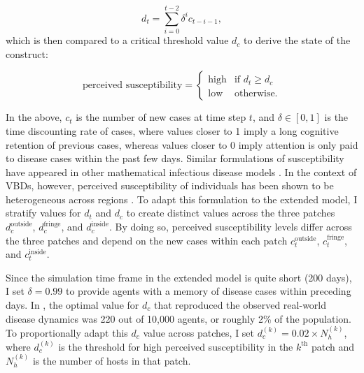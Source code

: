 \begin{equation}\label{eq:susceptibility}
    d_t=\sum_{i=0}^{t-2}\delta^i c_{t-i-1},
\end{equation}
which is then compared to a critical threshold value $d_c$ to derive the state of the construct:

\begin{equation*}
    \text{perceived susceptibility}=\begin{cases}
        \text{high} & \text{if } d_t\ge d_c \\
        \text{low} & \text{otherwise.}
    \end{cases}
\end{equation*}

In the above, $c_t$ is the number of new cases at time step $t$, and $\delta\in[0,1]$ is the time discounting rate of cases, where values closer to 1 imply a long cognitive retention of previous cases, whereas values closer to 0 imply attention is only paid to disease cases within the past few days. Similar formulations of susceptibility have appeared in other mathematical infectious disease models \cite{chen_public_2011, poletti_effect_2011}. In the context of VBDs, however, perceived susceptibility of individuals has been shown to be heterogeneous across regions \cite{raude_public_2012}. To adapt this formulation to the extended model, I stratify values for $d_t$ and $d_c$ to create distinct values across the three patches $d_c^{\text{outside}}$, $d_c^{\text{fringe}}$, and $d_c^{\text{inside}}$. By doing so, perceived susceptibility levels differ across the three patches and depend on the new cases within each patch $c_{t}^{\text{outside}}$, $c_{t}^{\text{fringe}}$, and $c_{t}^{\text{inside}}$.

Since the simulation time frame in the extended model is quite short (200 days), I set $\delta=0.99$ to provide agents with a memory of disease cases within preceding days. In \citet{durham_incorporating_2012}, the optimal value for $d_c$ that reproduced the observed real-world disease dynamics was 220 out of 10,000 agents, or roughly 2\% of the population. To proportionally adapt this $d_c$ value across patches, I set $d_c^{(k)}=0.02\times N_h^{(k)}$, where $d_c^{(k)}$ is the threshold for high perceived susceptibility in the $k^{\text{th}}$ patch and $N_h^{(k)}$ is the number of hosts in that patch.

